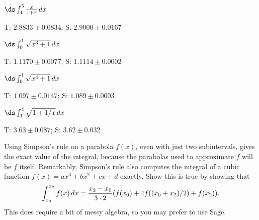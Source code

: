 \begin{enumialphparenastyle}
\begin{ex}
 $\ds\int_1^5 {x\over 1+x}\,dx$
\begin{sol}
 T: $2.8833\pm 0.0834$; S: $2.9000\pm 0.0167$
\end{sol}
\end{ex}

\begin{ex}
 $\ds\int_0^1 \sqrt{x^3+1}\,dx$
\begin{sol}
 T: $1.1170\pm 0.0077$; S: $1.1114\pm 0.0002$
\end{sol}
\end{ex}

\begin{ex}
 $\ds\int_0^1 \sqrt{x^4+1}\,dx$
\begin{sol}
 T: $1.097\pm 0.0147$; S: $1.089\pm 0.0003$
\end{sol}
\end{ex}

\begin{ex}
 $\ds\int_1^4 \sqrt{1+1/x}\,dx$
\begin{sol}
 T: $3.63\pm 0.087$; S: $3.62\pm 0.032$
\end{sol}
\end{ex}

\begin{ex}
 Using Simpson's rule on a parabola $f(x)$, even with just
two subintervals, gives the exact value of the integral, because the
parabolas used to approximate $f$ will be $f$ itself. Remarkably,
Simpson's rule also computes the integral of a cubic function
$f(x)=ax^3+bx^2+cx+d$ exactly. Show this is true by showing that
$$
  \int_{x_0}^{x_2}
  f(x)\,dx={x_2-x_0\over3\cdot2}(f(x_0)+4f((x_0+x_2)/2)+f(x_2)).
$$
This does require a bit of messy algebra, so you may prefer to use Sage.
\end{ex}

\end{enumialphparenastyle}